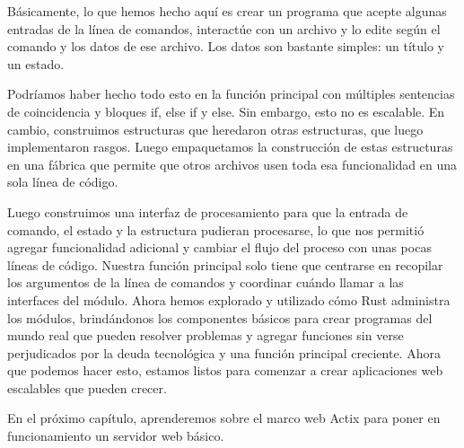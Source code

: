 Básicamente, lo que hemos hecho aquí es crear un programa que acepte algunas entradas de la línea de comandos, interactúe con un archivo y lo edite según el comando y los datos de ese archivo. Los datos son bastante simples: un título y un estado.

Podríamos haber hecho todo esto en la función principal con múltiples sentencias de coincidencia y bloques if, else if y else. Sin embargo, esto no es escalable. En cambio, construimos estructuras que heredaron otras estructuras, que luego implementaron rasgos. Luego empaquetamos la construcción de estas estructuras en una fábrica que permite que otros archivos usen toda esa funcionalidad en una sola línea de código.

Luego construimos una interfaz de procesamiento para que la entrada de comando, el estado y la estructura pudieran procesarse, lo que nos permitió agregar funcionalidad adicional y cambiar el flujo del proceso con unas pocas líneas de código. Nuestra función principal solo tiene que centrarse en recopilar los argumentos de la línea de comandos y coordinar cuándo llamar a las interfaces del módulo. Ahora hemos explorado y utilizado cómo Rust administra los módulos, brindándonos los componentes básicos para crear programas del mundo real que pueden resolver problemas y agregar funciones sin verse perjudicados por la deuda tecnológica y una función principal creciente. Ahora que podemos hacer esto, estamos listos para comenzar a crear aplicaciones web escalables que pueden crecer.

En el próximo capítulo, aprenderemos sobre el marco web Actix para poner en funcionamiento un servidor web básico.